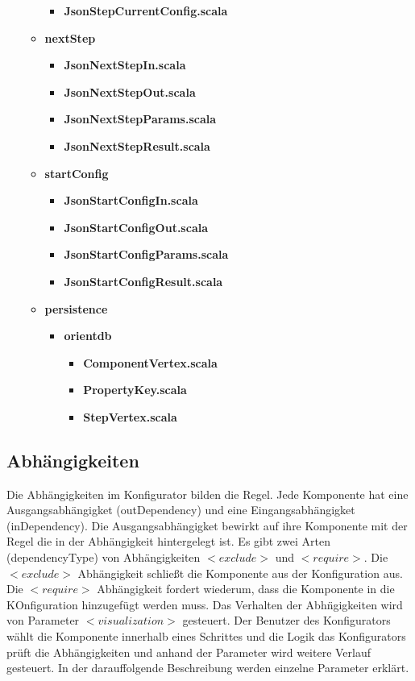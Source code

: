 \documentclass{article}
\begin{document}
\begin{itemize}
\begin{itemize}
\begin{itemize}
      \item \textbf{JsonStepCurrentConfig.scala}
    \end{itemize}
    \item \textbf{nextStep}
    \begin{itemize}
      \item \textbf{JsonNextStepIn.scala}
      \item \textbf{JsonNextStepOut.scala}
      \item \textbf{JsonNextStepParams.scala}
      \item \textbf{JsonNextStepResult.scala}
    \end{itemize}
    \item \textbf{startConfig}
    \begin{itemize}
      \item \textbf{JsonStartConfigIn.scala}
      \item \textbf{JsonStartConfigOut.scala}
      \item \textbf{JsonStartConfigParams.scala}
      \item \textbf{JsonStartConfigResult.scala}
    \end{itemize}
    \item \textbf{persistence}
    \begin{itemize}
      \item \textbf{orientdb}
      \begin{itemize}
        \item \textbf{ComponentVertex.scala}
        \item \textbf{PropertyKey.scala}
        \item \textbf{StepVertex.scala}
      \end{itemize}
    \end{itemize}
\end{itemize}
\end{itemize}
\subsection{Abh{\"a}ngigkeiten}

Die Abh\"angigkeiten im Konfigurator bilden die Regel. Jede Komponente hat eine
Ausgangsabh\"angigket (outDependency) und eine Eingangsabh\"angigket
(inDependency). Die Ausgangsabh\"angigket bewirkt auf ihre Komponente mit der
Regel die in der Abh\"angigkeit hintergelegt ist. 
Es gibt zwei Arten (dependencyType) von Abh\"angigkeiten $<exclude>$ und
$<require>$. Die $<exclude>$ Abh\"angigkeit schlie\ss{}t die Komponente aus der
Konfiguration aus. Die $<require>$ Abh\"angigkeit fordert wiederum, dass die
Komponente in die KOnfiguration hinzugef\"ugt werden muss. Das Verhalten der
Abh\"ngigkeiten wird von Parameter $<visualization>$ gesteuert. Der Benutzer
des Konfigurators w\"ahlt die Komponente innerhalb eines Schrittes und die
Logik das Konfigurators pr\"uft die Abh\"angigkeiten und anhand der Parameter
wird weitere Verlauf gesteuert. In der darauffolgende Beschreibung werden
einzelne Parameter erkl\"art.
\end{document}
